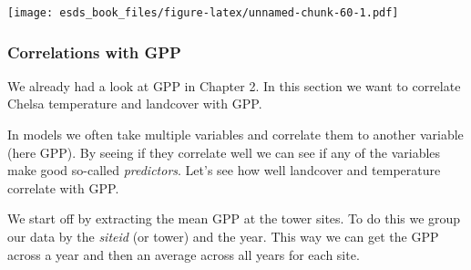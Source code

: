 \documentclass[
]{book}
\newenvironment{Shaded}{\begin{snugshade}}{\end{snugshade}}
\newcommand{\CommentTok}[1]{\textcolor[rgb]{0.56,0.35,0.01}{\textit{#1}}}
\newcommand{\DataTypeTok}[1]{\textcolor[rgb]{0.13,0.29,0.53}{#1}}
\newcommand{\DecValTok}[1]{\textcolor[rgb]{0.00,0.00,0.81}{#1}}
\newcommand{\KeywordTok}[1]{\textcolor[rgb]{0.13,0.29,0.53}{\textbf{#1}}}
\newcommand{\NormalTok}[1]{#1}
\newcommand{\OperatorTok}[1]{\textcolor[rgb]{0.81,0.36,0.00}{\textbf{#1}}}
\newcommand{\StringTok}[1]{\textcolor[rgb]{0.31,0.60,0.02}{#1}}
\begin{document}
\texttt{[image: esds\_book\_files/figure-latex/unnamed-chunk-60-1.pdf]}

\hypertarget{correlations-with-gpp}{%
\subsubsection{Correlations with GPP}\label{correlations-with-gpp}}

We already had a look at GPP in Chapter 2. In this section we want to correlate Chelsa temperature and landcover with GPP.

In models we often take multiple variables and correlate them to another variable (here GPP). By seeing if they correlate well we can see if any of the variables make good so-called \emph{predictors}. Let's see how well landcover and temperature correlate with GPP.

We start off by extracting the mean GPP at the tower sites. To do this we group our data by the \emph{siteid} (or tower) and the year. This way we can get the GPP across a year and then an average across all years for each site.

\begin{Shaded}
\end{Shaded}
\end{document}
